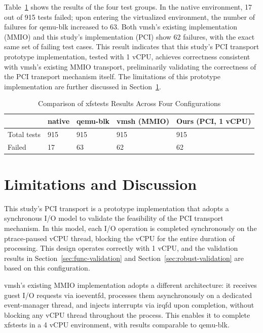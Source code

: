 \begin{ZhChapter}
Table~\ref{tab:xfstests-results} shows the results of the four test groups. In the native environment, 17 out of 915 tests failed; upon entering the virtualized environment, the number of failures for qemu-blk increased to 63. Both vmsh's existing implementation (MMIO) and this study's implementation (PCI) show 62 failures, with the exact same set of failing test cases. This result indicates that this study's PCI transport prototype implementation, tested with 1 vCPU, achieves correctness consistent with vmsh's existing MMIO transport, preliminarily validating the correctness of the PCI transport mechanism itself. The limitations of this prototype implementation are further discussed in Section~\ref{sec:limitations}.

\begin{table}[htbp]
    \centering
    \caption{Comparison of xfstests Results Across Four Configurations}
    \label{tab:xfstests-results}
    \renewcommand\arraystretch{1.5}{
        \begin{tabular}{| l | l | l | l | l |}
        \hline
         & native & qemu-blk & vmsh (MMIO) & Ours (PCI, 1 vCPU) \\
        \hline
        Total tests & 915 & 915 & 915 & 915 \\
        \hline
        Failed & 17 & 63 & 62 & 62 \\
        \hline
        \end{tabular}
    }
\end{table}

\section{Limitations and Discussion}
\label{sec:limitations}

This study's PCI transport is a prototype implementation that adopts a synchronous I/O model to validate the feasibility of the PCI transport mechanism. In this model, each I/O operation is completed synchronously on the ptrace-paused vCPU thread, blocking the vCPU for the entire duration of processing. This design operates correctly with 1 vCPU, and the validation results in Section~\ref{sec:func-validation} and Section~\ref{sec:robust-validation} are based on this configuration.

vmsh's existing MMIO implementation adopts a different architecture: it receives guest I/O requests via ioeventfd, processes them asynchronously on a dedicated event-manager thread, and injects interrupts via irqfd upon completion, without blocking any vCPU thread throughout the process. This enables it to complete xfstests in a 4 vCPU environment, with results comparable to qemu-blk.


\end{ZhChapter}
